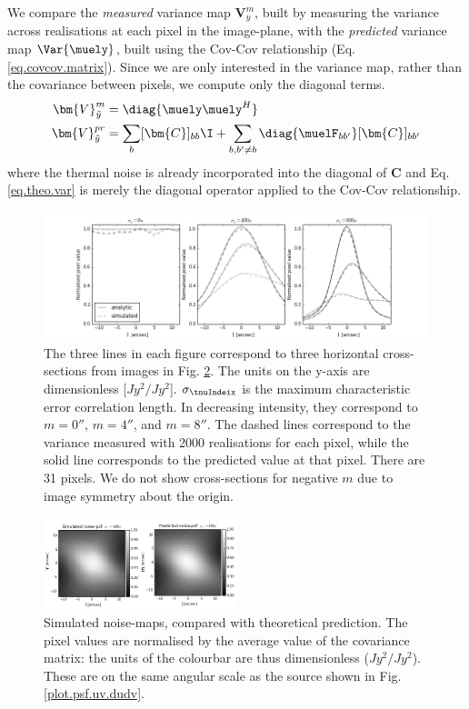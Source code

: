 We compare the \emph{measured} variance map $\bm{V}_y^m$, built by measuring the variance across realisations at each pixel in the image-plane, with the \emph{predicted} variance map $\Var{\muely}$, built using the Cov-Cov relationship (Eq. \ref{eq.covcov.matrix}). Since we are only interested in the variance map, rather than the covariance between pixels, we compute only the diagonal terms.
\begin{alignat}{2}
\bm{V}_{\tilde{y}}^m &= \diag{\muely\muely^H} \label{eq.meas.var}\\
\bm{V}_{\tilde{y}}^{pr} &= \sum_b [\bm{C}] _{bb}\I + \sum_{b,b'\ne b}\diag{\muelF_{bb'}}[\bm{C}]_{bb'}\label{eq.theo.var}
\end{alignat}
where the thermal noise is already incorporated into the diagonal of $\bm{C}$ and Eq. \ref{eq.theo.var} is merely the diagonal operator applied to the Cov-Cov relationship. 



\begin{figure}[t!]
\centering
\includegraphics[width=\textwidth]{images/cross_sections1.png}
\caption{\label{plot.cross-sections} The three lines in each figure correspond to three horizontal cross-sections from images in Fig. \ref{plot.noisepsfs}. {The units on the y-axis are dimensionless [$Jy^2/Jy^2$].} $\sigma_\tnuIndeix$ is the maximum characteristic error correlation length. In decreasing intensity, they correspond to  $m=0''$, $m=4''$, and $m=8''$. The dashed lines correspond to the variance measured with 2000 realisations for each pixel, while the solid line corresponds to the predicted value at that pixel. There are 31 pixels. We do not show cross-sections for negative $m$ due to image symmetry about the origin.}
\end{figure}

\begin{figure}[t!]
\centering
\includegraphics[width=0.5\textwidth]{images/noisepsf-ctime400.png} %
\caption{\label{plot.noisepsfs} Simulated noise-maps, compared with theoretical prediction. The pixel values are normalised by the average value of the covariance matrix: the units of the colourbar are thus dimensionless ($Jy^2/Jy^2$). These are on the same angular scale as the source shown in Fig. \ref{plot.psf.uv.dudv}.}
\end{figure}


